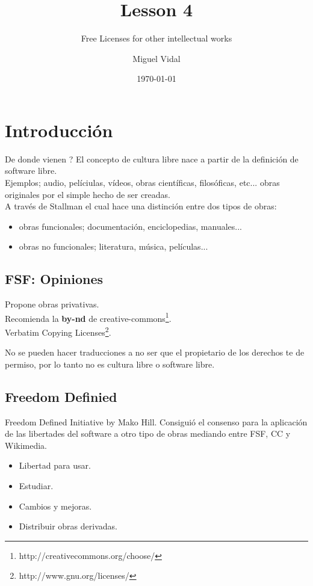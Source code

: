 \documentclass{scrartcl}
\title{\textbf{Lesson 4}}
\subtitle{Free Licenses for other intellectual works}
\author{Miguel Vidal}
\date{\today}
\begin{document}
\maketitle

\section{Introducci\'on}

De donde vienen ? El concepto de cultura libre nace a partir de la definici\'on de software libre.\\

Ejemplos; audio, pel\'iciulas, v\'ideos, obras cient\'ificas, filos\'oficas, etc... obras originales por el simple hecho de ser creadas.\\
A trav\'es de Stallman el cual hace una distinci\'on entre dos tipos de obras:
\begin{itemize}
    \item obras funcionales; documentaci\'on, enciclopedias, manuales...
    \item obras no funcionales; literatura, m\'usica, pel\'iculas...
\end{itemize}

\subsection{FSF: Opiniones}

Propone obras privativas.\\
Recomienda la \textbf{by-nd} de creative-commons\footnote{http://creativecommons.org/choose/}.\\
Verbatim Copying Licenses\footnote{http://www.gnu.org/licenses/}.

No se pueden hacer traducciones a no ser que el propietario de los derechos te de permiso, por lo tanto no es cultura libre o software libre.

\subsection{Freedom Definied}

Freedom Defined Initiative by Mako Hill. Consigui\'o el consenso para la aplicaci\'on de las libertades del software a otro tipo de obras mediando entre FSF, CC y Wikimedia.

\begin{itemize}
    \item Libertad para usar.
    \item Estudiar.
    \item Cambios y mejoras.
    \item Distribuir obras derivadas.
\end{itemize}
\end{document}
